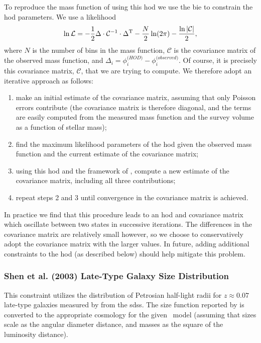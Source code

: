 To reproduce the mass function of \cite{martin_arecibo_2010} using this \gls{hod} we use the \gls{bie} \citep{weinberg_computational_2012} to constrain the \gls{hod} parameters. We use a likelihood
\begin{equation}
 \ln \mathcal{L} = -{1\over 2} \Delta\cdot \mathcal{C}^{-1}\cdot \Delta^{\mathrm T} - {N \over 2} \ln(2\pi) - {\ln |\mathcal{C}| \over 2},
\end{equation}
where $N$ is the number of bins in the mass function, $\mathcal{C}$ is the covariance matrix of the observed mass function, and $\Delta_i = \phi_i^{\mathrm (HOD)} - \phi_i^{\mathrm (observed)}$. Of course, it is precisely this covariance matrix, $\mathcal{C}$, that we are trying to compute. We therefore adopt an iterative approach as follows:
\begin{enumerate}
 \item make an initial estimate of the covariance matrix, assuming that only Poisson errors contribute (the covariance matrix is therefore diagonal, and the terms are easily computed from the measured mass function and the survey volume as a function of stellar mass);
 \item find the maximum likelihood parameters of the \gls{hod} given the observed mass function and the current estimate of the covariance matrix;
 \item using this \gls{hod} and the framework of \cite{smith_how_2012}, compute a new estimate of the covariance matrix, including all three contributions;
 \item repeat steps 2 and 3 until convergence in the covariance matrix is achieved.
\end{enumerate}
In practice we find that this procedure leads to an \gls{hod} and covariance matrix which oscillate between two states in successive iterations. The differences in the covariance matrix are relatively small however, so we choose to conservatively adopt the covariance matrix with the larger values. In future, adding additional constraints to the \gls{hod} (as described below) should help mitigate this problem.

\subsubsection{Shen et al. (2003) Late-Type Galaxy Size Distribution}\label{sec:SDSSLateTypeGalaxySizeDistribution}

This constraint utilizes the distribution of Petrosian half-light radii for $z\approx 0.07$ late-type galaxies measured by \cite{shen_size_2003} from the \gls{sdss}. The size function reported by \cite{shen_size_2003} is converted to the appropriate cosmology for the given \glc\ model (assuming that sizes scale as the angular diameter distance, and masses as the square of the luminosity distance).

